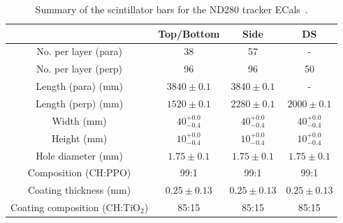 \begin{table}[t!]
  \begin{tabular}{ c c c c }
     & Top/Bottom & Side & DS \\ \hline \hline
  No. per layer (para) & 38 & 57 & - \\
  No. per layer (perp) & 96 & 96 & 50 \\
  Length (para) (mm) & $3840\pm0.1$ & $3840\pm0.1$ & - \\
  Length (perp) (mm) & $1520\pm0.1$ & $2280\pm0.1$ & $2000\pm0.1$ \\
  Width (mm) & $40^{+0.0}_{-0.4}$ & $40^{+0.0}_{-0.4}$& $40^{+0.0}_{-0.4}$ \\
  Height (mm) & $10^{+0.0}_{-0.4}$ & $10^{+0.0}_{-0.4}$& $10^{+0.0}_{-0.4}$ \\
  Hole diameter (mm) & $1.75\pm0.1$ & $1.75\pm0.1$ & $1.75\pm0.1$ \\
  Composition (CH:PPO) & 99:1 & 99:1 & 99:1 \\
  Coating thickness (mm) & $0.25\pm0.13$ & $0.25\pm0.13$ & $0.25\pm0.13$ \\
  Coating composition (CH:TiO$_2$) & 85:15 & 85:15 & 85:15 \\
  \end{tabular}
  \caption{Summary of the scintillator bars for the ND280 tracker ECals~\cite{1748-0221-8-10-P10019}.}
  \label{table:ScintillatorBarDimensions}
\end{table}



